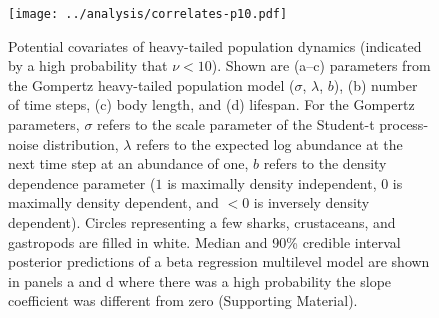 \begin{figure}[htbp]
\begin{center}
\texttt{[image: ../analysis/correlates-p10.pdf]}
\caption{
Potential covariates of heavy-tailed population dynamics (indicated by a high
probability that $\nu < 10$). Shown are (a--c) parameters from the Gompertz
heavy-tailed population model ($\sigma$, $\lambda$, $b$), (b) number of time
steps, (c) body length, and (d) lifespan. For the Gompertz parameters, $\sigma$
refers to the scale parameter of the Student-t process-noise distribution,
$\lambda$ refers to the expected log abundance at the next time step at an
abundance of one, $b$ refers to the density dependence parameter ($1$ is
maximally density independent, $0$ is maximally density dependent, and $<0$ is
inversely density dependent).
Circles representing a few sharks, crustaceans, and gastropods are filled in
white. Median and 90\% credible interval posterior predictions of a beta
regression multilevel model are shown in panels a and d where there was a high
probability the slope coefficient was different from zero (Supporting
Material).
}
\label{fig:correlates}
\end{center}
\end{figure}
